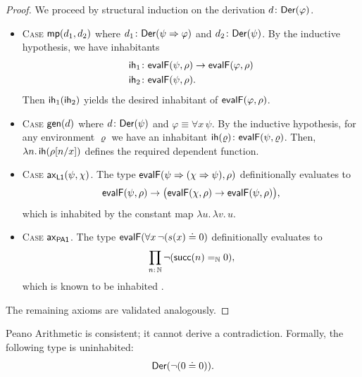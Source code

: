 \begin{proof}
    We proceed by structural induction on the derivation $d\colon\fun{Der}(\varphi)$.
    \begin{itemize}
        \item \textsc{Case} $\mathsf{mp}(d_1,d_2)$ where $d_1\colon\fun{Der}(\psi\imp\varphi)$ and $d_2\colon\fun{Der}(\psi)$. By the inductive hypothesis, we have inhabitants
        \begin{align*}
            \fun{ih}_1&\colon\fun{evalF}(\psi, \rho)\to\fun{evalF}(\varphi, \rho)\\
            \fun{ih}_2&\colon\fun{evalF}(\psi, \rho).
        \end{align*}
        Then $\mathsf{ih}_1(\mathsf{ih}_2)$ yields the desired inhabitant of $\mathsf{evalF}(\varphi,\rho)$.
        
        \item \textsc{Case} $\mathsf{gen}(d)$ where $d\colon\fun{Der}(\psi)$ and $\varphi\equiv\forall x\,\psi$. By the inductive hypothesis, for any environment $\varrho$ we have an inhabitant $\fun{ih}(\varrho)\colon\fun{evalF}(\psi,\varrho)$. Then, $\lambda n.\,\mathsf{ih}(\rho[n/x])$ defines the required dependent function.
        
        \item \textsc{Case} $\mathsf{ax}_{\mathsf{L1}}(\psi, \chi)$. The type $\mathsf{evalF}(\psi\mathrel{\Rightarrow}(\chi\mathrel{\Rightarrow}\psi),\rho)$ definitionally evaluates to
        \[
            \mathsf{evalF}(\psi,\rho)\to\bigl(
                \mathsf{evalF}(\chi,\rho)
                \to
                \mathsf{evalF}(\psi,\rho)
            \bigr),
        \]
        which is inhabited by the constant map $\lambda u.\,\lambda v.\,u$.
        
        \item \textsc{Case} $\mathsf{ax}_{\mathsf{PA1}}$. The type $\mathsf{evalF}(\forall x\,\neg(s(x)\doteq0)$ definitionally evaluates to
        \[
            \prod_{n\colon\N}\neg(\fun{succ}(n)\eq{\N}0),
        \]
        which is known to be inhabited \citep[Chapter~1]{caniglia2025hott}.
    \end{itemize}
    The remaining axioms are validated analogously.
\end{proof}

\begin{thm}[Consistency]
    \label{thm:pa-consistency}
    Peano Arithmetic is consistent; it cannot derive a contradiction. Formally, the following type is uninhabited:
    \[
        \mathsf{Der}(\neg(0\doteq 0)).
    \]
\end{thm}

